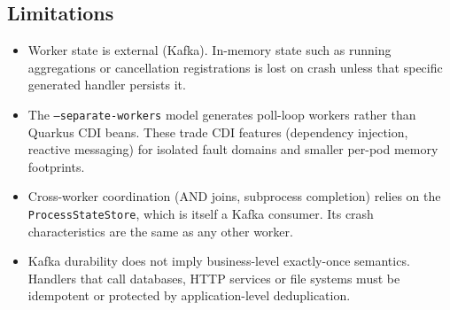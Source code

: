 \subsection{Limitations}

\begin{itemize}
\item Worker state is external (Kafka). In-memory state such as running
      aggregations or cancellation registrations is lost on crash unless that
      specific generated handler persists it.
\item The \texttt{--separate-workers} model generates poll-loop workers
      rather than Quarkus CDI beans. These trade CDI features
      (dependency injection, reactive messaging) for isolated fault
      domains and smaller per-pod memory footprints.
\item Cross-worker coordination (AND joins, subprocess completion) relies
      on the \texttt{ProcessStateStore}, which is itself a Kafka
      consumer. Its crash characteristics are the same as any other
      worker.
\item Kafka durability does not imply business-level exactly-once semantics.
      Handlers that call databases, HTTP services or file systems must be
      idempotent or protected by application-level deduplication.
\end{itemize}

